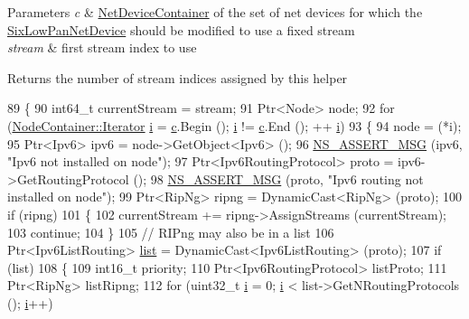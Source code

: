 \begin{DoxyParams}{Parameters}
{\em c} & \hyperlink{classns3_1_1NetDeviceContainer}{Net\+Device\+Container} of the set of net devices for which the \hyperlink{classns3_1_1SixLowPanNetDevice}{Six\+Low\+Pan\+Net\+Device} should be modified to use a fixed stream \\
\hline
{\em stream} & first stream index to use \\
\hline
\end{DoxyParams}
\begin{DoxyReturn}{Returns}
the number of stream indices assigned by this helper 
\end{DoxyReturn}

\begin{DoxyCode}
89 \{
90   int64\_t currentStream = stream;
91   Ptr<Node> node;
92   \textcolor{keywordflow}{for} (\hyperlink{classns3_1_1NodeContainer_aa1a9f2d2b09bfef7d066d3974bca2cc4}{NodeContainer::Iterator} \hyperlink{bernuolliDistribution_8m_a6f6ccfcf58b31cb6412107d9d5281426}{i} = \hyperlink{lte_2model_2fading-traces_2fading__trace__generator_8m_ae0323a9039add2978bf5b49550572c7c}{c}.Begin (); \hyperlink{bernuolliDistribution_8m_a6f6ccfcf58b31cb6412107d9d5281426}{i} != \hyperlink{lte_2model_2fading-traces_2fading__trace__generator_8m_ae0323a9039add2978bf5b49550572c7c}{c}.End (); ++
      \hyperlink{bernuolliDistribution_8m_a6f6ccfcf58b31cb6412107d9d5281426}{i})
93     \{
94       node = (*i);
95       Ptr<Ipv6> ipv6 = node->GetObject<Ipv6> ();
96       \hyperlink{assert_8h_aff5ece9066c74e681e74999856f08539}{NS\_ASSERT\_MSG} (ipv6, \textcolor{stringliteral}{"Ipv6 not installed on node"});
97       Ptr<Ipv6RoutingProtocol> proto = ipv6->GetRoutingProtocol ();
98       \hyperlink{assert_8h_aff5ece9066c74e681e74999856f08539}{NS\_ASSERT\_MSG} (proto, \textcolor{stringliteral}{"Ipv6 routing not installed on node"});
99       Ptr<RipNg> ripng = DynamicCast<RipNg> (proto);
100       \textcolor{keywordflow}{if} (ripng)
101         \{
102           currentStream += ripng->AssignStreams (currentStream);
103           \textcolor{keywordflow}{continue};
104         \}
105       \textcolor{comment}{// RIPng may also be in a list}
106       Ptr<Ipv6ListRouting> \hyperlink{openflow-interface_8h_afd9bcfa176617760671b67580f536fa7}{list} = DynamicCast<Ipv6ListRouting> (proto);
107       \textcolor{keywordflow}{if} (list)
108         \{
109           int16\_t priority;
110           Ptr<Ipv6RoutingProtocol> listProto;
111           Ptr<RipNg> listRipng;
112           \textcolor{keywordflow}{for} (uint32\_t \hyperlink{bernuolliDistribution_8m_a6f6ccfcf58b31cb6412107d9d5281426}{i} = 0; \hyperlink{bernuolliDistribution_8m_a6f6ccfcf58b31cb6412107d9d5281426}{i} < list->GetNRoutingProtocols (); \hyperlink{bernuolliDistribution_8m_a6f6ccfcf58b31cb6412107d9d5281426}{i}++)

\end{DoxyCode}
